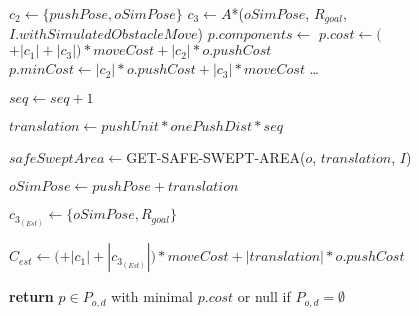 \begin{algorithm}[H]
\begin{algorithmic}[1]

            \State $c_{2} \gets \{pushPose, oSimPose\}$
            \State $c_{3} \gets A$*($oSimPose$, $R_{goal}$, $I.withSimulatedObstacleMove$)
              \State $p.components \gets$ 
              \State $p.cost \gets ($$ + |c_{1}| + |c_{3}|) * moveCost + |c_{2}| * o.pushCost$
              \State $p.minCost \gets |c_{2}| * o.pushCost + |c_{3}| * moveCost$
              \State \dots {}
            \EndIf

          \State $seq \gets seq + 1$

          \State $translation \gets pushUnit * onePushDist * seq$

          \State $safeSweptArea \gets $GET-SAFE-SWEPT-AREA($o$, $translation$, $I$)

          \State $oSimPose \gets pushPose + translation$

          \State $c_{3_{(Est)}} \gets \{oSimPose, R_{goal}\}$

          \State $C_{est} \gets ($$ + |c_{1}| + |c_{3_{(Est)}}|) * moveCost + |translation| * o.pushCost$

        \EndWhile

      \EndFor

    \State \textbf{return} $p \in P_{o,d}$ with minimal $p.cost$ or null if $P_{o,d} = \emptyset$

    \EndProcedure

  \end{algorithmic}
\end{algorithm}
